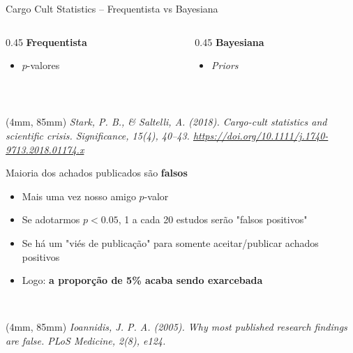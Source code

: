 \documentclass[12pt, xcolor=dvipsnames]{beamer}
\newenvironment{reference}[2]{                                    %
  \begin{textblock*}{\textwidth}(#1, #2)
      \tiny\it\bgroup\color{red!70!QPblue}}{\egroup\end{textblock*}}
\begin{document}
\begin{frame}{Cargo Cult Statistics -- Frequentista vs Bayesiana}
  \begin{columns}[T]

    \begin{column}{0.45\textwidth}
      {\Large \textbf{Frequentista}}
      \begin{itemize}
        \item $p$-valores
      \end{itemize}
    \end{column}

    \begin{column}{0.45\textwidth}
      {\Large \textbf{Bayesiana}}
      \begin{itemize}
        \item \textit{Priors}
      \end{itemize}
    \end{column}
  \end{columns}

  ~\\[2ex]

  \begin{reference}{4mm}{85mm}
    Stark, P. B., \& Saltelli, A. (2018). Cargo-cult statistics and scientific crisis. Significance, 15(4), 40–43.
    \url{https://doi.org/10.1111/j.1740-9713.2018.01174.x}
  \end{reference}
\end{frame}


\begin{frame}{Maioria dos achados publicados são \textbf{falsos}}
  \begin{itemize}
    \item<2-> Mais uma vez nosso amigo $p$-valor
    \item<3-> Se adotarmos $p < 0.05$, 1 a cada 20 estudos serão "falsos positivos"
    \item<4-> Se há um "viés de publicação" para somente aceitar/publicar achados positivos
    \item<5-> Logo: \textbf{a proporção de 5\% acaba sendo exarcebada}
  \end{itemize}

  ~\\[2ex]
  \centering

  \begin{reference}{4mm}{85mm}
    Ioannidis, J. P. A. (2005). Why most published research findings are false. PLoS Medicine, 2(8), e124.
  \end{reference}
\end{frame}




\end{document}
